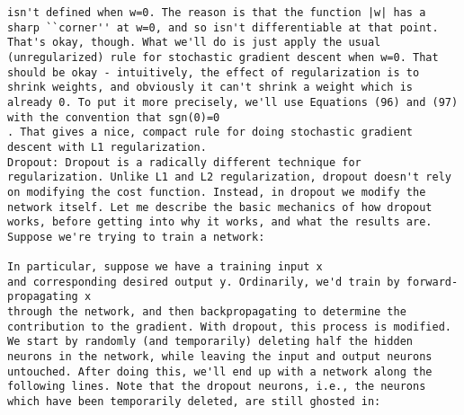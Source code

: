 \begin{lstlisting}
isn't defined when w=0. The reason is that the function |w| has a sharp ``corner'' at w=0, and so isn't differentiable at that point. That's okay, though. What we'll do is just apply the usual (unregularized) rule for stochastic gradient descent when w=0. That should be okay - intuitively, the effect of regularization is to shrink weights, and obviously it can't shrink a weight which is already 0. To put it more precisely, we'll use Equations (96) and (97) with the convention that sgn(0)=0
. That gives a nice, compact rule for doing stochastic gradient descent with L1 regularization.
Dropout: Dropout is a radically different technique for regularization. Unlike L1 and L2 regularization, dropout doesn't rely on modifying the cost function. Instead, in dropout we modify the network itself. Let me describe the basic mechanics of how dropout works, before getting into why it works, and what the results are.
Suppose we're trying to train a network:

In particular, suppose we have a training input x
and corresponding desired output y. Ordinarily, we'd train by forward-propagating x
through the network, and then backpropagating to determine the contribution to the gradient. With dropout, this process is modified. We start by randomly (and temporarily) deleting half the hidden neurons in the network, while leaving the input and output neurons untouched. After doing this, we'll end up with a network along the following lines. Note that the dropout neurons, i.e., the neurons which have been temporarily deleted, are still ghosted in:


\end{lstlisting}
